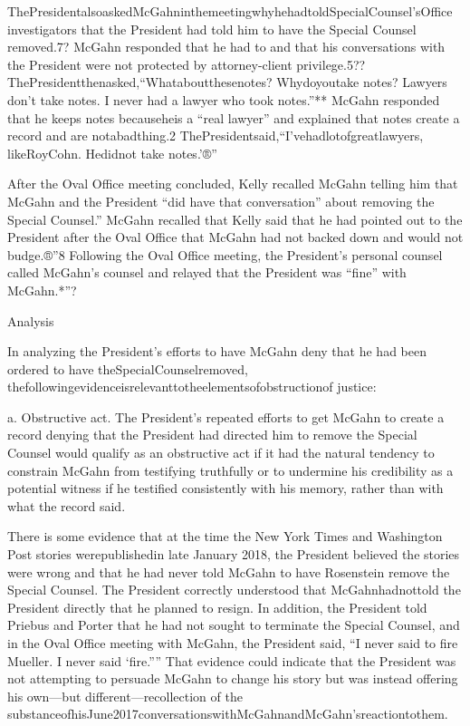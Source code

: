 ThePresidentalsoaskedMcGahninthemeetingwhyhehadtoldSpecialCounsel'sOffice investigators that the President had told him to have the Special Counsel removed.7?
McGahn responded that he had to and that his conversations with the President were not protected by attorney-client privilege.5??
ThePresidentthenasked,“Whataboutthesenotes? Whydoyoutake notes? Lawyers don't take notes.
I never had a lawyer who took notes.”**
McGahn responded that he keeps notes becauseheis a “real lawyer” and explained that notes create a record and are notabadthing.2
ThePresidentsaid,“I'vehadlotofgreatlawyers, likeRoyCohn. Hedidnot take notes.'®”

After the Oval Office meeting concluded, Kelly recalled McGahn telling him that McGahn and the President “did have that conversation” about removing the Special Counsel.”
McGahn recalled that Kelly said that he had pointed out to the President after the Oval Office that McGahn had not backed down and would not budge.®”8
Following the Oval Office meeting, the President's personal counsel called McGahn's counsel and relayed that the President was “fine” with McGahn.*”?

Analysis

In analyzing the President's efforts to have McGahn deny that he had been ordered to have theSpecialCounselremoved, thefollowingevidenceisrelevanttotheelementsofobstructionof
justice:

a. Obstructive act. The President's repeated efforts to get McGahn to create a record denying that the President had directed him to remove the Special Counsel would qualify as an obstructive act if it had the natural tendency to constrain McGahn from testifying truthfully or to undermine his credibility as a potential witness if he testified consistently with his memory, rather than with what the record said.

There is some evidence that at the time the New York Times and Washington Post stories werepublishedin late January 2018, the President believed the stories were wrong and that he had never told McGahn to have Rosenstein remove the Special Counsel.
The President correctly understood that McGahnhadnottold the President directly that he planned to resign.
In addition, the President told Priebus and Porter that he had not sought to terminate the Special Counsel, and in the Oval Office meeting with McGahn, the President said, “I never said to fire Mueller.
I never said ‘fire.””
That evidence could indicate that the President was not attempting to persuade McGahn to change his story but was instead offering his own—but different—recollection of the substanceofhisJune2017conversationswithMcGahnandMcGahn'sreactiontothem.

